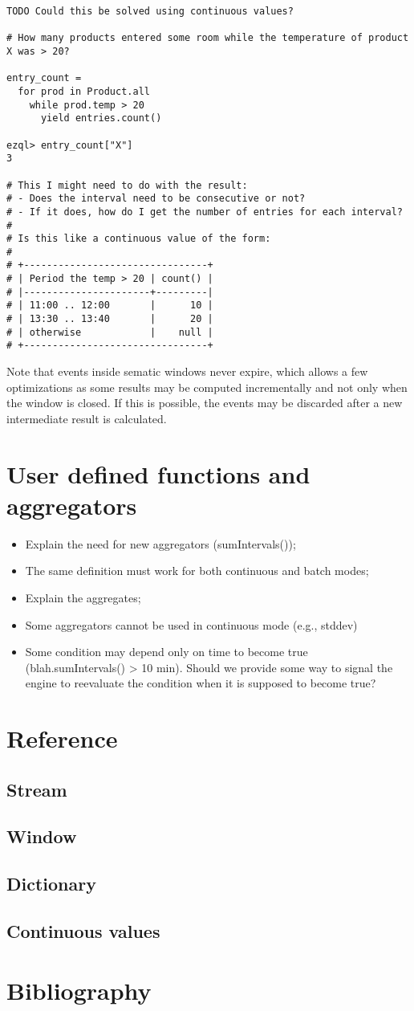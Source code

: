 \documentclass{report}
\begin{document}
\begin{verbatim}
TODO Could this be solved using continuous values?

# How many products entered some room while the temperature of product X was > 20?

entry_count =
  for prod in Product.all
    while prod.temp > 20
      yield entries.count()

ezql> entry_count["X"]
3

# This I might need to do with the result:
# - Does the interval need to be consecutive or not?
# - If it does, how do I get the number of entries for each interval?
#
# Is this like a continuous value of the form:
#
# +--------------------------------+
# | Period the temp > 20 | count() |
# |----------------------+---------|
# | 11:00 .. 12:00       |      10 |
# | 13:30 .. 13:40       |      20 |
# | otherwise            |    null |
# +--------------------------------+
\end{verbatim}

Note that events inside sematic windows never expire, which allows a
few optimizations as some results may be computed incrementally and
not only when the window is closed. If this is possible, the events
may be discarded after a new intermediate result is calculated.

\chapter{User defined functions and aggregators}
\label{chap:udfs}

\begin{itemize}
\item Explain the need for new aggregators (sumIntervals());
\item The same definition must work for both continuous and batch modes;
\item Explain the aggregates;
\item Some aggregators cannot be used in continuous mode (e.g., stddev)
\item Some condition may depend only on time to become true
  (blah.sumIntervals() > 10 min). Should we provide some way to signal
  the engine to reevaluate the condition when it is supposed to become
  true?
\end{itemize}
\chapter{Reference}

\section{Stream}

\section{Window}

\section{Dictionary}

\section{Continuous values}

\chapter{Bibliography}
\end{document}
